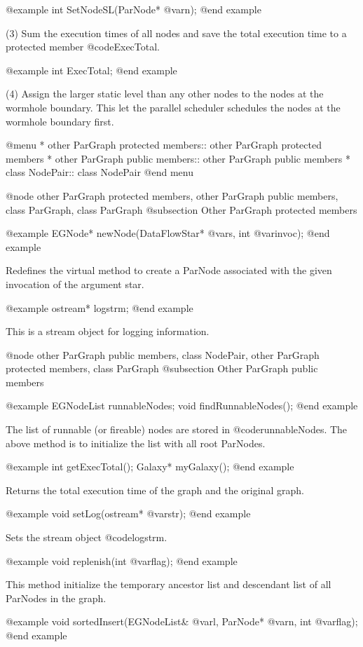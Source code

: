 @example
int SetNodeSL(ParNode* @var{n});
@end example

(3) Sum the execution times of all nodes and save the total execution time
to a protected member @code{ExecTotal}.

@example
int ExecTotal;
@end example

(4) Assign the larger static level than any other nodes to the nodes at
the wormhole boundary. This let the parallel scheduler schedules the
nodes at the wormhole boundary first.

@menu
* other ParGraph protected members::	other ParGraph protected members
* other ParGraph public members::	other ParGraph public members
* class NodePair::			class NodePair
@end menu

@node other ParGraph protected members, other ParGraph public members, class ParGraph, class ParGraph
@subsection Other ParGraph protected members

@example
EGNode* newNode(DataFlowStar* @var{s}, int @var{invoc});
@end example

Redefines the virtual method to create a ParNode associated with the
given invocation of the argument star.

@example
ostream* logstrm;
@end example

This is a stream object for logging information.

@node other ParGraph public members, class NodePair, other ParGraph protected members, class ParGraph
@subsection Other ParGraph public members

@example
EGNodeList runnableNodes;
void findRunnableNodes();
@end example

The list of runnable (or fireable) nodes are stored in @code{runnableNodes}.
The above method is to initialize the list with all root ParNodes.

@example
int getExecTotal();
Galaxy* myGalaxy();
@end example

Returns the total execution time of the graph and the original graph.

@example
void setLog(ostream* @var{str});
@end example

Sets the stream object @code{logstrm}.

@example
void replenish(int @var{flag});
@end example

This method initialize the temporary ancestor list and descendant list
of all ParNodes in the graph.

@example
void sortedInsert(EGNodeList& @var{l}, ParNode* @var{n}, int @var{flag});
@end example

